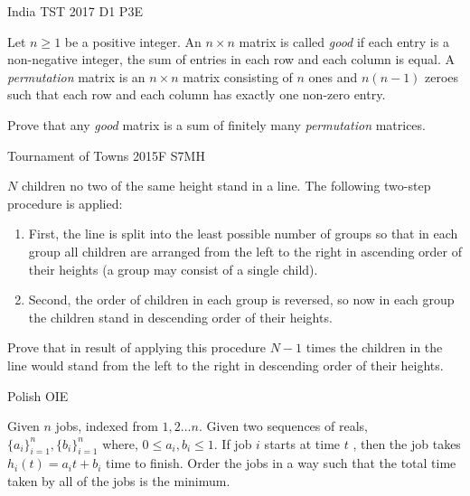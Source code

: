 


{India TST 2017 D1 P3}{E}{
    Let $n \ge 1$ be a positive integer. An $n \times n$ matrix
    is called \textit{good} if each entry is a non-negative integer, the sum
    of entries in each row and each column is equal. A \textit{permutation}
    matrix is an $n \times n$ matrix consisting of $n$ ones and $n(n-1)$
    zeroes such that each row and each column has exactly one non-zero
    entry.

    Prove that any \textit{good} matrix is a sum of finitely many
    \textit{permutation} matrices.
}




{Tournament of Towns 2015F S7}{MH}{
    $N$ children no two of the same height stand in a line. The following
    two-step procedure is applied: 
    \begin{enumerate}[label=$\square$, itemsep=0pt, left=0pt]
        \item First, the line is split into the least possible number of groups so that
            in each group all children are arranged from the left to the right in
            ascending order of their heights (a group may consist of a single child).
        \item Second, the order of children in each group is reversed, so now in each
            group the children stand in descending order of their heights. 
    \end{enumerate}
    Prove that in result of applying this procedure $N - 1$ times the children
    in the line would stand from the left to the right in descending order of
    their heights.
}



{Polish OI}{E}{
    Given $ n $ jobs, indexed from $ 1, 2\dots n $. Given two sequences of
    reals, $ \{a_i\}^n_{i=1}, \{b_i\}^n_{i=1} $ where, $ 0 \leq a_i, b_i \leq
    1 $. If job $ i $ starts at time $ t $ , then the job takes $ h_i(t) =
    a_it+b_i $ time to finish. Order the jobs in a way such that the total
    time taken by all of the jobs is the minimum.

}\label{problem:forget_and_focus_2}\label{problem:swapping_1}

